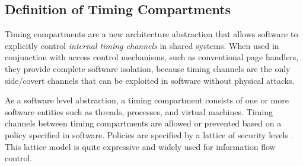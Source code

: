 



\subsection{Definition of Timing Compartments}

Timing compartments are a new architecture abstraction that allows software to
explicitly control {\em internal timing channels} in shared systems.
When used in conjunction with access
control mechanisms, such as conventional page handlers, they provide complete software 
isolation, because timing channels are the only side/covert channels that can be
exploited in software without physical attacks.

As a software level abstraction, a timing compartment consists of one or more 
software entities such as threads, processes, and virtual machines.  Timing 
channels between timing compartments are allowed or prevented based on a policy 
specified in software.  Policies are specified by a lattice of security levels
\cite{denning}.
This lattice model is quite expressive and widely used for information flow 
control. 

